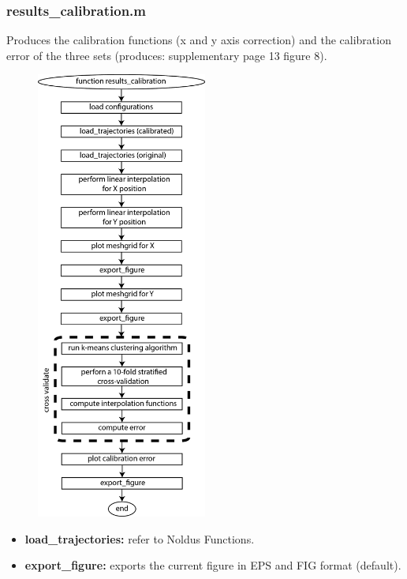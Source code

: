 \documentclass[12pt,titlepage]{article}
\begin{document}
\begin{doublespace}
\subsubsection{results\_calibration.m}
Produces the calibration functions (x and y axis correction) and the calibration error of the three sets (produces: supplementary page 13 figure 8).

\begin{figure}[H]
	\begin{center}
		\includegraphics[width=0.5\textwidth]{results_calibration.jpg}
		\label{sfig8-10}
	\end{center}
\end{figure}

\begin{itemize}
	\item\textbf{load\_trajectories:} refer to Noldus Functions.
	\item\textbf{export\_figure:} exports the current figure in EPS and FIG format (default).
\end{itemize}	


\end{doublespace}
\end{document}
